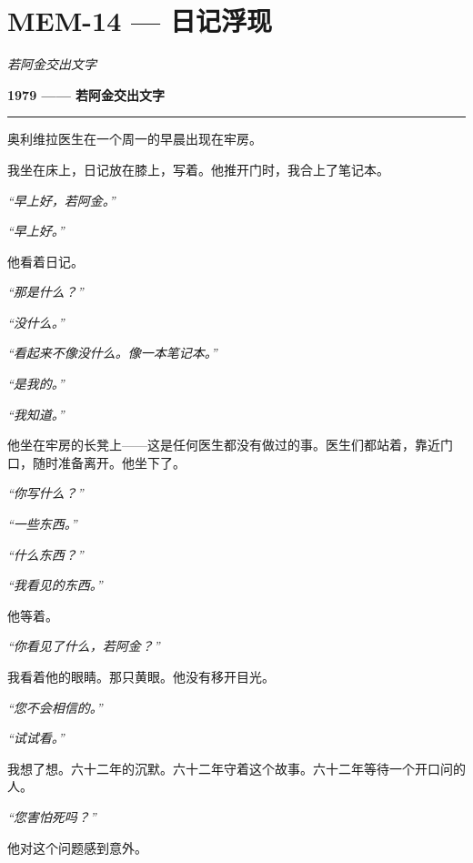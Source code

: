 \section*{\textbf{MEM-14} --- 日记浮现}

\noindent \textit{若阿金交出文字}

\noindent \textbf{1979 —— 若阿金交出文字}

\vspace{0.5em}\noindent\rule{\textwidth}{0.5pt}\vspace{0.5em}

\noindent 奥利维拉医生在一个周一的早晨出现在牢房。

\noindent 我坐在床上，日记放在膝上，写着。他推开门时，我合上了笔记本。

\noindent \textit{“早上好，若阿金。”}

\noindent \textit{“早上好。”}

\noindent 他看着日记。

\noindent \textit{“那是什么？”}

\noindent \textit{“没什么。”}

\noindent \textit{“看起来不像没什么。像一本笔记本。”}

\noindent \textit{“是我的。”}

\noindent \textit{“我知道。”}

\noindent 他坐在牢房的长凳上——这是任何医生都没有做过的事。医生们都站着，靠近门口，随时准备离开。他坐下了。

\noindent \textit{“你写什么？”}

\noindent \textit{“一些东西。”}

\noindent \textit{“什么东西？”}

\noindent \textit{“我看见的东西。”}

\noindent 他等着。

\noindent \textit{“你看见了什么，若阿金？”}

\noindent 我看着他的眼睛。那只黄眼。他没有移开目光。

\noindent \textit{“您不会相信的。”}

\noindent \textit{“试试看。”}

\noindent 我想了想。六十二年的沉默。六十二年守着这个故事。六十二年等待一个开口问的人。

\noindent \textit{“您害怕死吗？”}

\noindent 他对这个问题感到意外。

